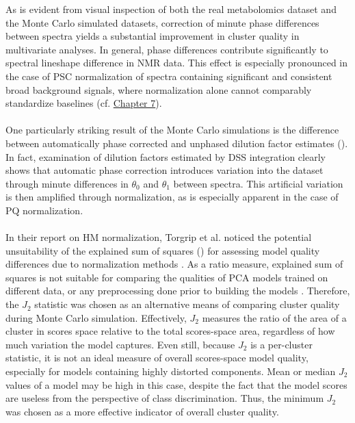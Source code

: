 \begin{doublespace}
As is evident from visual inspection of both the real metabolomics dataset and
the Monte Carlo simulated datasets, correction of minute phase differences
between spectra yields a substantial improvement in cluster quality in
multivariate analyses. In general, phase differences contribute significantly
to spectral lineshape difference in \hnmr{} NMR data. This effect is especially
pronounced in the case of PSC normalization of spectra containing significant
and consistent broad background signals, where normalization alone cannot
comparably standardize baselines (cf. \hyperlink{chapter.7}{Chapter 7}).
\\\\
One particularly striking result of the Monte Carlo simulations is the
difference between automatically phase corrected and unphased dilution factor
estimates (). In fact, examination of dilution factors
estimated by DSS integration clearly shows that automatic phase correction
introduces variation into the dataset through minute differences
in $\theta_0$ and $\theta_1$ between spectra. This artificial variation
is then amplified through normalization, as is especially apparent in the
case of PQ normalization.
\\\\
In their report on HM normalization, Torgrip et al. noticed the potential
unsuitability of the explained sum of squares (\rsqx{}) for assessing model
quality differences due to normalization methods \cite{torgrip:metab2008}.
As a ratio measure, explained sum of squares is not suitable for comparing
the qualities of PCA models trained on different data, or any preprocessing
done prior to building the models \cite{kjeldahl:jchemo2010}. Therefore, the
$J_2$ statistic was chosen as an alternative means of comparing cluster quality
during Monte Carlo simulation. Effectively, $J_2$ measures the ratio of the
area of a cluster in scores space relative to the total scores-space area,
regardless of how much variation the model captures. Even still, because $J_2$
is a per-cluster statistic, it is not an ideal measure of overall scores-space
model quality, especially for models containing highly distorted components.
Mean or median $J_2$ values of a model may be high in this case, despite the
fact that the model scores are useless from the perspective of class
discrimination. Thus, the minimum $J_2$ was chosen as a more effective
indicator of overall cluster quality.
\end{doublespace}

